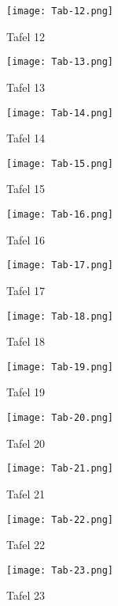\documentclass[a4paper, 11pt, oneside, german]{article}
\begin{document}
\clearpage
\begin{figure}[b]
\caption{Tafel 12}
\texttt{[image: Tab-12.png]}
\centering
\end{figure}
\clearpage
\begin{figure}[b]
\caption{Tafel 13}
\texttt{[image: Tab-13.png]}
\centering
\end{figure}
\clearpage
\begin{figure}[b]
\caption{Tafel 14}
\texttt{[image: Tab-14.png]}
\centering
\end{figure}
\clearpage
\begin{figure}[b]
\caption{Tafel 15}
\texttt{[image: Tab-15.png]}
\centering
\end{figure}
\clearpage
\begin{figure}[b]
\caption{Tafel 16}
\texttt{[image: Tab-16.png]}
\centering
\end{figure}
\clearpage
\begin{figure}[b]
\caption{Tafel 17}
\texttt{[image: Tab-17.png]}
\centering
\end{figure}
\clearpage
\begin{figure}[b]
\caption{Tafel 18}
\texttt{[image: Tab-18.png]}
\centering
\end{figure}
\clearpage
\begin{figure}[b]
\caption{Tafel 19}
\texttt{[image: Tab-19.png]}
\centering
\end{figure}
\clearpage
\begin{figure}[b]
\caption{Tafel 20}
\texttt{[image: Tab-20.png]}
\centering
\end{figure}
\clearpage
\begin{figure}[b]
\caption{Tafel 21}
\texttt{[image: Tab-21.png]}
\centering
\end{figure}
\clearpage
\begin{figure}[b]
\caption{Tafel 22}
\texttt{[image: Tab-22.png]}
\centering
\end{figure}
\clearpage
\begin{figure}[b]
\caption{Tafel 23}
\texttt{[image: Tab-23.png]}
\centering
\end{figure}
\end{document}
